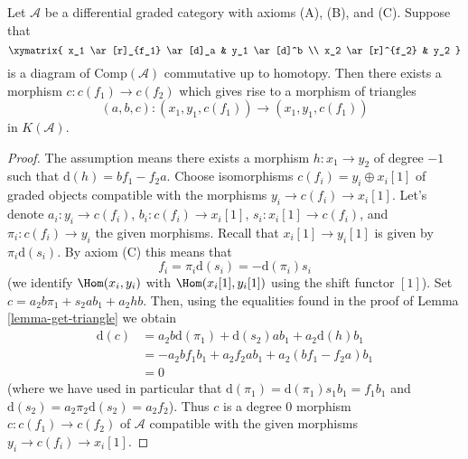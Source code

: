 \begin{lemma}
\label{lemma-cone}
Let $\mathcal{A}$ be a differential graded category with axioms (A), (B), and
(C). Suppose that
$$
\xymatrix{
x_1 \ar[r]_{f_1} \ar[d]_a & y_1 \ar[d]^b \\
x_2 \ar[r]^{f_2} & y_2
}
$$
is a diagram of $\text{Comp}(\mathcal{A})$ commutative up to homotopy.
Then there exists a morphism $c : c(f_1) \to c(f_2)$ which gives rise to
a morphism of triangles
$$
(a, b, c) : (x_1, y_1, c(f_1)) \to (x_1, y_1, c(f_1))
$$
in $K(\mathcal{A})$.
\end{lemma}

\begin{proof}
The assumption means there exists a morphism $h : x_1 \to y_2$ of degree
$-1$ such that $\text{d}(h) = b f_1 - f_2 a$. Choose isomorphisms
$c(f_i) = y_i \oplus x_i[1]$ of graded objects compatible with the
morphisms $y_i \to c(f_i) \to x_i[1]$. Let's denote
$a_i : y_i \to c(f_i)$, $b_i : c(f_i) \to x_i[1]$, $s_i : x_i[1] \to c(f_i)$,
and $\pi_i : c(f_i) \to y_i$ the given morphisms. Recall that
$x_i[1] \to y_i[1]$ is given by $\pi_i \text{d}(s_i)$. By axiom (C)
this means that
$$
f_i = \pi_i \text{d}(s_i) = - \text{d}(\pi_i) s_i
$$
(we identify $\Hom(x_i, y_i)$ with $\Hom(x_i[1], y_i[1])$
using the shift functor $[1]$).
Set $c = a_2 b \pi_1 + s_2 a b_1 + a_2hb$. Then, using the
equalities found in the proof of Lemma \ref{lemma-get-triangle}
we obtain
\begin{align*}
\text{d}(c)
& =
a_2 b \text{d}(\pi_1) + \text{d}(s_2) a b_1 + a_2 \text{d}(h) b_1 \\
& =
- a_2 b f_1 b_1 + a_2 f_2 a b_1 + a_2 (b f_1 - f_2 a) b_1 \\
& = 0
\end{align*}
(where we have used in particular that
$\text{d}(\pi_1) = \text{d}(\pi_1) s_1 b_1 = f_1 b_1$ and
$\text{d}(s_2) = a_2 \pi_2 \text{d}(s_2) = a_2 f_2$).
Thus $c$ is a degree $0$ morphism $c : c(f_1) \to c(f_2)$ of $\mathcal{A}$
compatible with the given morphisms $y_i \to c(f_i) \to x_i[1]$.
\end{proof}

